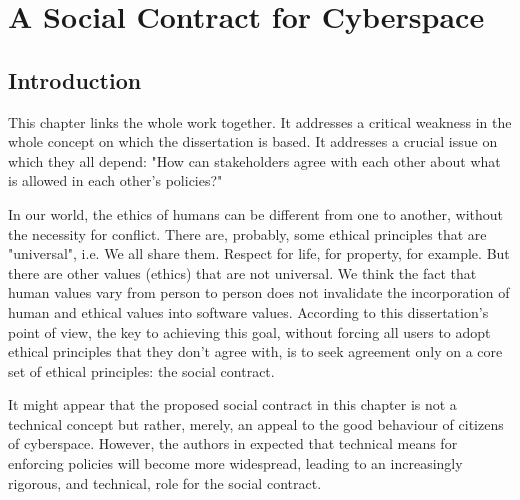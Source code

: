 \chapter{A Social Contract for Cyberspace}
\section{Introduction}
This chapter links the whole work together.  It addresses a critical weakness in the whole concept on which the dissertation is based. It addresses a crucial issue on which they all depend: "How can stakeholders agree with each other about what is allowed in each other's policies?"

In our world, the ethics of humans can be different from one to another, without the necessity for conflict. There are, probably, some ethical principles that are "universal", i.e. We all share them. Respect for life, for property, for example. But there are other values (ethics) that are not universal. We think the fact that human values vary from person to person does not invalidate the incorporation of human and ethical values into software values. According to this dissertation's point of view, the key to achieving this goal, without forcing all users to adopt ethical principles that they don't agree with, is to seek agreement only on a core set of ethical principles: the social contract.

It might appear that the proposed social contract in this chapter is not a technical concept but rather, merely, an appeal to the good behaviour of citizens of cyberspace. However, the authors in \cite{sheniar2021social} expected that technical means for enforcing policies will become more widespread, leading to an increasingly rigorous, and technical, role for the social contract.